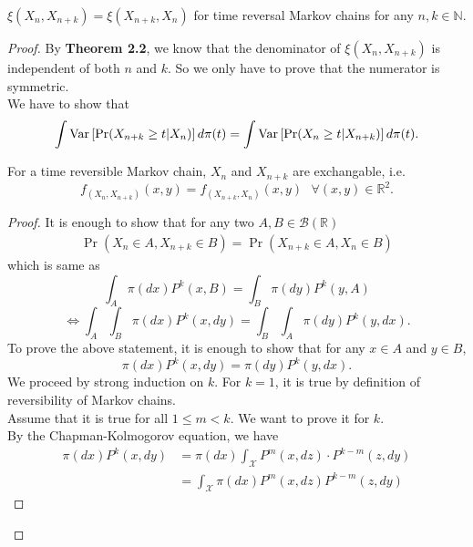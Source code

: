 \begin{theorem}
    $\xi(X_n, X_{n+k}) = \xi(X_{n+k}, X_n)$ for time reversal Markov chains for any $n, k \in \mathbb{N}$.
    \begin{proof}
        By \textbf{Theorem 2.2}, we know that the denominator of $\xi(X_n, X_{n+k})$ is independent of both $n$ and $k$. So we only have to prove that the numerator is symmetric. \\
        We have to show that
        \begin{equation*}
            \int \text{Var}\left[{{\Pr (X_{n+k} \geq t | X_n)}}\right] d\pi(t) = \int \text{Var}\left[{{\Pr (X_n \geq t | X_{n+k})}}\right] d\pi(t).
        \end{equation*}
        \begin{lem}
            For a time reversible Markov chain, $X_n$ and $X_{n+k}$ are exchangable, i.e.
            \begin{equation*}
                f_{(X_{n}, X_{n+k})}(x, y) = f_{(X_{n+k}, X_{n})}(x, y) \text{  } \forall (x, y) \in \mathbb{R}^2.
            \end{equation*}
            \begin{proof}
                It is enough to show that for any two $A, B \in \mathcal{B}(\mathbb{R})$
                \begin{align*}
                    \Pr(X_n \in A, X_{n+k} \in B) = \Pr(X_{n+k} \in A, X_{n} \in B)
                \end{align*}
                which is same as
                    $$\int_A \pi(dx) P^k(x, B) = \int_B \pi(dy) P^k(y, A)$$
                    $$\Longleftrightarrow\int_A \int_B \pi(dx) P^k(x, dy) = \int_B \int_A \pi(dy) P^k(y, dx).$$
                To prove the above statement, it is enough to show that for any $x \in A$ and $y \in B$,
                $$\pi(dx) P^k(x, dy) = \pi(dy) P^k(y, dx).$$
                We proceed by strong induction on $k$.
                For $k = 1$, it is true by definition of reversibility of Markov chains.\\
                Assume that it is true for all $1 \leq m < k$.
                We want to prove it for $k$.\\
                By the Chapman-Kolmogorov equation, we have
                \begin{align*}
                    \pi(dx) P^k(x, dy) &= \pi(dx) \int_{\mathcal{X}} P^m(x, dz)\cdot P^{k-m}(z, dy)\\
                    &= \int_{\mathcal{X}} \pi(dx) P^m(x, dz) P^{k-m}(z, dy)
                \end{align*}

\end{proof}
\end{lem}
\end{proof}
\end{theorem}
